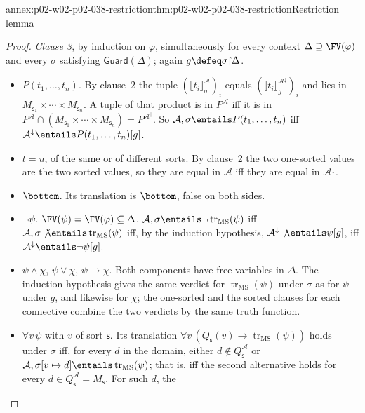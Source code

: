 \begin{annexitem}{annex:p02-w02-p02-038-restriction}{thm:p02-w02-p02-038-restriction}{Restriction lemma}
\begin{proof}
\emph{Clause 3}, by induction on \(\varphi\), simultaneously for every
context \(\Delta\supseteq\FV(\varphi)\) and every \(\sigma\) satisfying
\(\mathsf{Guard}(\Delta)\); again \(g\defeq\sigma{\restriction}\Delta\).
\begin{itemize}
\item \(P(t_1,\ldots,t_n)\).  By clause~2 the tuple
      \((\llbracket t_i\rrbracket^{\mathcal A}_{\sigma})_i\) equals
      \((\llbracket t_i\rrbracket^{\mathcal A^{\downarrow}}_{g})_i\) and lies
      in \(M_{\mathsf s_1}\times\cdots\times M_{\mathsf s_n}\).  A tuple of
      that product is in \(P^{\mathcal A}\) iff it is in
      \(P^{\mathcal A}\cap(M_{\mathsf s_1}\times\cdots\times M_{\mathsf s_n})
      =P^{\mathcal A^{\downarrow}}\).  So
      \(\mathcal A,\sigma\entails P(t_1,\ldots,t_n)\) iff
      \(\mathcal A^{\downarrow}\entails P(t_1,\ldots,t_n)[g]\).
\item \(t=u\), of the same or of different sorts.  By clause~2 the two
      one-sorted values are the two sorted values, so they are equal in
      \(\mathcal A\) iff they are equal in \(\mathcal A^{\downarrow}\).
\item \(\bottom\).  Its translation is \(\bottom\), false on both sides.
\item \(\neg\psi\).  \(\FV(\psi)=\FV(\varphi)\subseteq\Delta\).
      \(\mathcal A,\sigma\entails\neg\operatorname{tr}_{\mathrm{MS}}(\psi)\)
      iff \(\mathcal A,\sigma\not\entails\operatorname{tr}_{\mathrm{MS}}(\psi)\)
      iff, by the induction hypothesis,
      \(\mathcal A^{\downarrow}\not\entails\psi[g]\), iff
      \(\mathcal A^{\downarrow}\entails\neg\psi[g]\).
\item \(\psi\land\chi\), \(\psi\lor\chi\), \(\psi\to\chi\).  Both
      components have free variables in \(\Delta\).  The induction hypothesis
      gives the same verdict for \(\operatorname{tr}_{\mathrm{MS}}(\psi)\)
      under \(\sigma\) as for \(\psi\) under \(g\), and likewise for
      \(\chi\); the one-sorted and the sorted clauses for each connective
      combine the two verdicts by the same truth function.
\item \(\forall v\,\psi\) with \(v\) of sort \(\mathsf s\).  Its translation
      \(\forall v\,(Q_{\mathsf s}(v)\to\operatorname{tr}_{\mathrm{MS}}(\psi))\)
      holds under \(\sigma\) iff, for every \(d\) in the domain, either
      \(d\notin Q_{\mathsf s}^{\mathcal A}\) or
      \(\mathcal A,\sigma[v\mapsto d]\entails\operatorname{tr}_{\mathrm{MS}}(\psi)\);
      that is, iff the second alternative holds for every
      \(d\in Q_{\mathsf s}^{\mathcal A}=M_{\mathsf s}\).  For such \(d\), the

\end{itemize}
\end{proof}
\end{annexitem}
